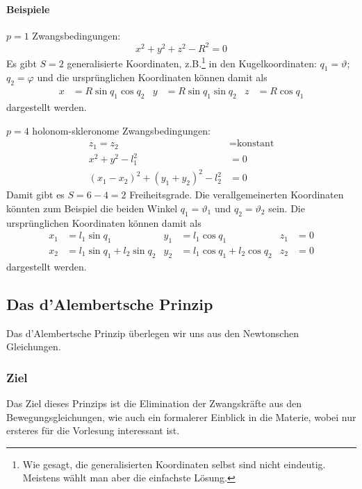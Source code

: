 \paragraph{Beispiele}

\begin{beispiel*}
$p = 1$ Zwangsbedingungen:
$$x^2 + y^2 + z^2 - R^2 = 0$$
Es gibt $S = 2$ generalisierte Koordinaten, z.B.\footnote{Wie gesagt, die generalisierten Koordinaten selbst sind nicht eindeutig. Meistens wählt man aber die einfachste Lösung.} in den Kugelkoordinaten: $q_1 = \vartheta$; $q_2 = \varphi$ und die ursprünglichen Koordinaten können damit als 
\begin{align*}
x &= R \sin{q_1} \cos{q_2} & y &= R \sin q_1 \sin q_2 & z &= R \cos q_1
\end{align*}
dargestellt werden.
\end{beispiel*}

\begin{beispiel*} $p = 4$ holonom-skleronome Zwangsbedingungen:
\begin{align*}
	z_1 = z_2 &= \text{konstant}\\
	x^2 + y^2 - l^2_1 &= 0\\
	(x_1 - x_2)^2 + (y_1 + y_2)^2 - l_2^2 &= 0 
\end{align*}
Damit gibt es $S = 6 - 4= 2$ Freiheitsgrade. Die verallgemeinerten Koordinaten könnten zum Beispiel die beiden Winkel $q_1 = \vartheta_1$ und $q_2 = \vartheta_2$ sein. Die ursprünglichen Koordinaten können damit als 
\begin{align*}
x_1 &= l_1 \sin q_1 & y_1 &= l_1 \cos q_1 & z_1 &= 0\\
x_2 &= l_1 \sin q_1 + l_2 \sin q_2 & y_2 &= l_1 \cos q_1 + l_2 \cos q_2 & z_2 &= 0
\end{align*}
dargestellt werden.
\end{beispiel*}


\subsection{Das d'Alembertsche Prinzip}
Das d'Alembertsche Prinzip überlegen wir uns aus den Newtonschen Gleichungen.

\subsubsection{Ziel} Das Ziel dieses Prinzips ist die Elimination der Zwangskräfte aus den Bewegungsgleichungen, wie auch ein formalerer Einblick in die Materie, wobei nur ersteres für die Vorlesung interessant ist.

